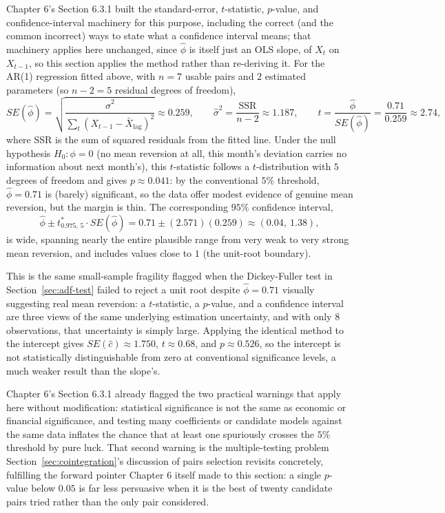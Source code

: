 \documentclass[../ai_in_finance]{subfiles}
\begin{document}
Chapter 6's Section 6.3.1 built the standard-error, $t$-statistic, $p$-value, and confidence-interval machinery for this purpose, including the correct (and the common incorrect) ways to state what a confidence interval means; that machinery applies here unchanged, since $\hat\phi$ is itself just an OLS slope, of $X_t$ on $X_{t-1}$, so this section applies the method rather than re-deriving it. For the AR(1) regression fitted above, with $n=7$ usable pairs and $2$ estimated parameters (so $n-2=5$ residual degrees of freedom),
\begin{equation*}
SE(\hat\phi) = \sqrt{\frac{\hat\sigma^2}{\sum_t (X_{t-1}-\bar X_{\text{lag}})^2}} \approx 0.259, \qquad \hat\sigma^2 = \frac{\text{SSR}}{n-2} \approx 1.187, \qquad t = \frac{\hat\phi}{SE(\hat\phi)} = \frac{0.71}{0.259} \approx 2.74,
\end{equation*}
where SSR is the sum of squared residuals from the fitted line. Under the null hypothesis $H_0: \phi = 0$ (no mean reversion at all, this month's deviation carries no information about next month's), this $t$-statistic follows a $t$-distribution with $5$ degrees of freedom and gives $p \approx 0.041$: by the conventional $5\%$ threshold, $\hat\phi = 0.71$ is (barely) significant, so the data offer modest evidence of genuine mean reversion, but the margin is thin. The corresponding $95\%$ confidence interval,
\begin{equation*}
\hat\phi \pm t^*_{0.975,\,5}\cdot SE(\hat\phi) = 0.71 \pm (2.571)(0.259) \approx (0.04,\ 1.38),
\end{equation*}
is wide, spanning nearly the entire plausible range from very weak to very strong mean reversion, and includes values close to $1$ (the unit-root boundary).

This is the same small-sample fragility flagged when the Dickey-Fuller test in Section~\ref{sec:adf-test} failed to reject a unit root despite $\hat\phi = 0.71$ visually suggesting real mean reversion: a $t$-statistic, a $p$-value, and a confidence interval are three views of the same underlying estimation uncertainty, and with only $8$ observations, that uncertainty is simply large. Applying the identical method to the intercept gives $SE(\hat c) \approx 1.750$, $t \approx 0.68$, and $p \approx 0.526$, so the intercept is not statistically distinguishable from zero at conventional significance levels, a much weaker result than the slope's.

Chapter 6's Section 6.3.1 already flagged the two practical warnings that apply here without modification: statistical significance is not the same as economic or financial significance, and testing many coefficients or candidate models against the same data inflates the chance that at least one spuriously crosses the $5\%$ threshold by pure luck.
That second warning is the multiple-testing problem Section~\ref{sec:cointegration}'s discussion of pairs selection revisits concretely, fulfilling the forward pointer Chapter 6 itself made to this section: a single $p$-value below $0.05$ is far less persuasive when it is the best of twenty candidate pairs tried rather than the only pair considered.
\end{document}
